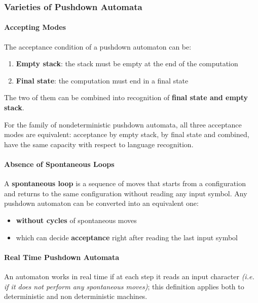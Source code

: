 \documentclass[english]{article}
\begin{document}
\subsubsection{Varieties of Pushdown Automata}

\paragraph{Accepting Modes}

The acceptance condition of a pushdown automaton can be:

\begin{enumerate}
  \item \textbf{Empty stack}: the stack must be empty at the end of the computation
  \item \textbf{Final state}: the computation must end in a final state
\end{enumerate}

The two of them can be combined into recognition of \textbf{final state and empty stack}.

For the family of nondeterministic pushdown automata, all three acceptance modes are equivalent:
acceptance by empty stack, by final state and combined, have the same capacity with respect to language recognition.

\paragraph{Absence of Spontaneous Loops}

A \textbf{spontaneous loop} is a sequence of moves that starts from a configuration and returns to the same configuration without reading any input symbol.
Any pushdown automaton can be converted into an equivalent one:

\begin{itemize}
  \item \textbf{without cycles} of spontaneous moves
  \item which can decide \textbf{acceptance} right after reading the last input symbol
\end{itemize}

\paragraph{Real Time Pushdown Automata}

An automaton works in real time if at each step it reads an input character \textit{(i.e. if it does not perform any spontaneous moves)};
this definition applies both to deterministic and non deterministic machines.
\end{document}
